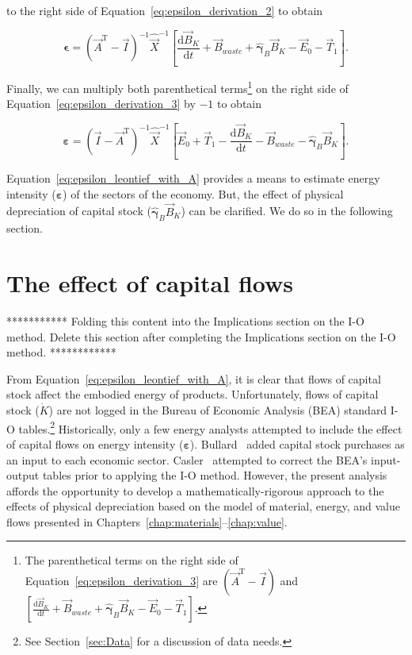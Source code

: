 \noindent{}to the right side of Equation~\ref{eq:epsilon_derivation_2} to obtain

\begin{equation} \label{eq:epsilon_derivation_3}
	\bm{\epsilon}
	= {(\vec{A}^{\mathrm{T}} - \vec{I})}^{-1} {\hat{\vec{X}}}^{-1} 
		\left[
			\frac{\mathrm{d}\vec{B}_{K}}{\mathrm{d}t}
			+ \vec{B}_{waste}
			+ \hat{\bm{\gamma}}_{B} \vec{B}_{K}
			- \vec{E}_{0}
			- \vec{T}_{1} 
		\right].
\end{equation}

\noindent{}Finally, we can multiply both parenthetical terms\footnote{The parenthetical
terms on the right side of Equation~\ref{eq:epsilon_derivation_3} 
are $(\vec{A}^{\mathrm{T}} - \vec{I})$ and
$
\left[
	\frac{\mathrm{d}\vec{B}_{K}}{\mathrm{d}t}
	+ \vec{B}_{waste}
	+ \hat{\bm{\gamma}}_{B} \vec{B}_{K}
	- \vec{E}_{0}
	- \vec{T}_{1} 
\right]
$.} 
on the right side of Equation~\ref{eq:epsilon_derivation_3} by $-1$ to obtain

\begin{equation} \label{eq:epsilon_leontief_with_A}
	\bm{\varepsilon} 
	= {(\vec{I} - \vec{A}^{\mathrm{T}})}^{-1}\hat{\vec{X}}^{-1}
		\left[\vec{E}_{0} 
				+ \vec{T}_{1} 
				- \frac{\mathrm{d}\vec{B}_{K}}{\mathrm{d}t} 
				- \vec{B}_{waste}
				- \hat{\bm{\gamma}}_{B}\vec{B}_{K}
		\right].
\end{equation}

Equation~\ref{eq:epsilon_leontief_with_A} provides a means 
to estimate energy intensity ($\bm{\varepsilon}$)
of the sectors of the economy. 
But, the effect of physical depreciation of capital stock
($\hat{\bm{\gamma}}_{B}\vec{B}_{K}$) 
can be clarified.
We do so in the following section.

\section{The effect of capital flows}
\label{sec:intensity_capital_correction}

*********** Folding this content into the
Implications section on the I-O method. 
Delete this section after completing the Implications section
on the I-O method. ************

From Equation~\ref{eq:epsilon_leontief_with_A},
it is clear that flows of capital stock affect
the embodied energy of products.
Unfortunately, flows of capital stock ($\dot{K}$) are not logged in the 
Bureau of Economic Analysis (BEA) standard I-O tables.\footnote{See
Section~\ref{sec:Data} for a discussion of data needs.}
Historically, only a few energy analysts attempted to include the effect
of capital flows on energy intensity ($\bm{\varepsilon}$). 
Bullard~\cite{Bullard1975} added capital stock purchases as an input
to each economic sector.
Casler~\cite{Casler:1983uy} attempted to correct the BEA's
input-output tables prior to applying the I-O method.
However, the present analysis affords the opportunity
to develop a mathematically-rigorous approach to the 
effects of physical depreciation based on 
the model of material, energy, and value flows presented 
in Chapters~\ref{chap:materials}--\ref{chap:value}.


